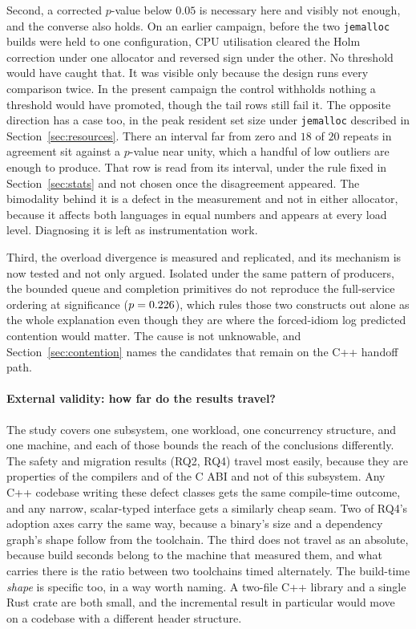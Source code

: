 \documentclass[english,oneside,a4paper,censored,csm,software-track-2020]{HYthesisML}
\begin{document}
Second, a corrected $p$-value below $0.05$ is necessary here and visibly not enough, and the
converse also holds. On an earlier campaign, before the two \texttt{jemalloc} builds were held to
one configuration, CPU utilisation cleared the Holm correction under one allocator and reversed
sign under the other. No threshold would have caught that. It was visible only because the
design runs every comparison twice. In the present campaign the control withholds nothing a
threshold would have promoted, though the tail rows still fail it. The opposite direction has a case
too, in the peak resident set size under \texttt{jemalloc} described in
Section~\ref{sec:resources}. There an interval far from zero and $18$ of $20$ repeats in agreement
sit against a $p$-value near unity, which a handful of low outliers are enough to produce. That row is
read from its interval, under the rule fixed in Section~\ref{sec:stats} and not chosen once the
disagreement appeared. The bimodality behind it is a defect in the measurement and not in
either allocator, because it affects both languages in equal numbers and appears at every load
level. Diagnosing it is left as instrumentation work.

Third, the overload divergence is measured and replicated, and its mechanism is now tested and
not only argued. Isolated under the same pattern of \ContentionProducers{} producers, the bounded
queue and completion primitives do not reproduce the full-service ordering at significance
($p = 0.226$), which rules those two constructs out alone as the whole explanation even
though they are where the forced-idiom log predicted contention would matter. The cause is not
unknowable, and Section~\ref{sec:contention} names the candidates that remain on the C++ handoff
path.

\paragraph{External validity: how far do the results travel?}
The study covers one subsystem, one workload, one concurrency structure, and one machine, and
each of those bounds the reach of the conclusions differently. The safety and migration
results (RQ2, RQ4) travel most easily, because they are properties of the compilers and
of the C ABI and not of this subsystem. Any C++ codebase writing these defect classes gets
the same compile-time outcome, and any narrow, scalar-typed interface gets a similarly cheap
seam. Two of RQ4's adoption axes carry the same way, because a binary's size and a dependency
graph's shape follow from the toolchain. The third does not travel as an absolute, because
build seconds belong to the machine that measured them, and what carries there is the ratio
between two toolchains timed alternately. The build-time \emph{shape} is specific too, in a way
worth naming. A two-file C++ library and a single Rust crate are both small, and the incremental
result in particular would move on a codebase with a different header structure.
\end{document}
